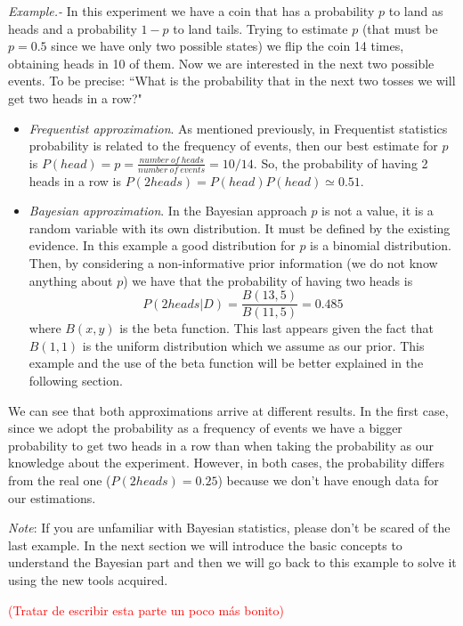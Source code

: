 \documentclass[onecolumn,           %
               showpacs,            %
               preprintnumbers,     %
               aps,                 %
               letterpaper,             %
               superscriptaddress,      %
               nofootinbib,         %
               tightenlines,        %
               floats,floatfix      %
               ,usenatbib,
               ]{revtex4-1}
\begin{document}
\textit{Example.-} In this experiment we have a coin that has a probability $p$ to land as heads and a probability $1-p$ to land tails. Trying to estimate $p$ (that must be $p=0.5$ since we have only two possible states) we flip the coin 14 times, obtaining heads in 10 of them. Now we are interested in the next two possible events. To be precise: ``What is the probability that in the next two tosses we will get two heads in a row?"
\begin{itemize}
\item \textit{Frequentist approximation}. As mentioned previously, in Frequentist statistics probability is related to the frequency of events, then our best estimate for $p$ is $P(head)=p=\frac{number \: of\: heads}{number\: of\: events}=10/14$. So, the probability of having 2 heads in a row is $P(2heads)=P(head)P(head)\simeq 0.51$.  
\item \textit{Bayesian approximation}. In the Bayesian approach $p$ is not a value, it is a random variable with its own distribution. It must be defined by the existing evidence. In this example a good distribution for $p$ is a binomial distribution. Then, by considering a non-informative prior information (we do not know anything about $p$) we have that the probability of having two heads is
\[
P(2heads|D)=\frac{B(13,5)}{B(11,5)}=0.485
\]
where $B(x,y)$ is the beta function. This last appears given the fact that $B(1,1)$ is the uniform distribution which we assume as our prior. This example and the use of the beta function will be better explained in the following section. 
\end{itemize}

We can see that both approximations arrive at different results. In the first case, since we adopt the probability as a frequency of events we have a bigger probability to get two heads in a row than when taking the probability as our knowledge about the experiment. However, in both cases, the probability differs from the real one ($P(2heads)=0.25$) because we don't have enough data for our estimations.

\textit{Note}: If you are unfamiliar with Bayesian statistics, please don't be scared of the last example. In the next section we will introduce the basic concepts to understand the Bayesian part and then we will go back to this example to solve it using the new tools acquired.   

\textcolor{red}{(Tratar de escribir esta parte un poco m\'as bonito)}
\end{document}
